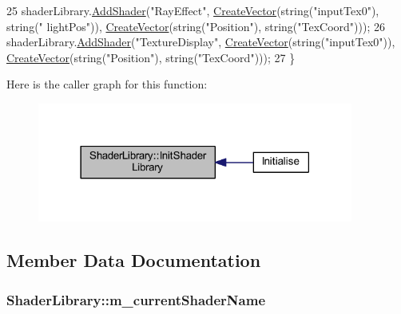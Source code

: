 \begin{DoxyCode}
25     shaderLibrary.\hyperlink{struct_shader_library_a5fac5a46dda49ceb6d1d361fd68b62a2}{AddShader}(\textcolor{stringliteral}{"RayEffect"}, \hyperlink{_utility_8h_a436e7214fa09365bcae7bc4386dab85b}{CreateVector}(\textcolor{keywordtype}{string}(\textcolor{stringliteral}{"inputTex0"}), \textcolor{keywordtype}{string}(\textcolor{stringliteral}{"
      lightPos"})), \hyperlink{_utility_8h_a436e7214fa09365bcae7bc4386dab85b}{CreateVector}(\textcolor{keywordtype}{string}(\textcolor{stringliteral}{"Position"}), \textcolor{keywordtype}{string}(\textcolor{stringliteral}{"TexCoord"})));
26     shaderLibrary.\hyperlink{struct_shader_library_a5fac5a46dda49ceb6d1d361fd68b62a2}{AddShader}(\textcolor{stringliteral}{"TextureDisplay"}, \hyperlink{_utility_8h_a436e7214fa09365bcae7bc4386dab85b}{CreateVector}(\textcolor{keywordtype}{string}(\textcolor{stringliteral}{"inputTex0"})), 
      \hyperlink{_utility_8h_a436e7214fa09365bcae7bc4386dab85b}{CreateVector}(\textcolor{keywordtype}{string}(\textcolor{stringliteral}{"Position"}), \textcolor{keywordtype}{string}(\textcolor{stringliteral}{"TexCoord"})));
27 \}
\end{DoxyCode}


Here is the caller graph for this function\+:\nopagebreak
\begin{figure}[H]
\begin{center}
\leavevmode
\includegraphics[width=294pt]{struct_shader_library_ac5a116b42faf885357d2118f91d5bb39_icgraph}
\end{center}
\end{figure}




\subsection{Member Data Documentation}
\subsubsection[{\texorpdfstring{m\+\_\+current\+Shader\+Name}{m_currentShaderName}}]{ Shader\+Library\+::m\+\_\+current\+Shader\+Name\hspace{0.3cm}{\ttfamily [private]}}\hypertarget{struct_shader_library_a26d1faccd3c7408a99ef4753596e7ee7}{}\label{struct_shader_library_a26d1faccd3c7408a99ef4753596e7ee7}



